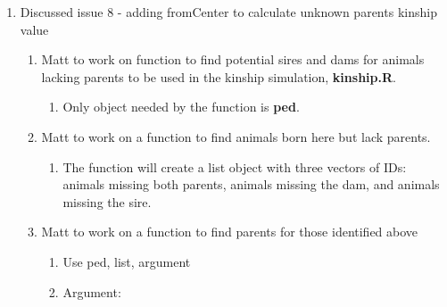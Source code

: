 \documentclass[
]{article}
\providecommand{\tightlist}{%
  \setlength{\itemsep}{0pt}\setlength{\parskip}{0pt}}
\begin{document}
\begin{enumerate}
\def\labelenumi{\arabic{enumi}.}
\tightlist
\item
  Discussed issue 8 - adding fromCenter to calculate unknown parents
  kinship value

  \begin{enumerate}
  \def\labelenumii{\alph{enumii}.}
  \tightlist
  \item
    Matt to work on function to find potential sires and dams for
    animals lacking parents to be used in the kinship simulation,
    \textbf{kinship.R}.

    \begin{enumerate}
    \def\labelenumiii{\arabic{enumiii}.}
    \tightlist
    \item
      Only object needed by the function is \textbf{ped}.
    \end{enumerate}
  \item
    Matt to work on a function to find animals born here but lack
    parents.

    \begin{enumerate}
    \def\labelenumiii{\arabic{enumiii}.}
    \tightlist
    \item
      The function will create a list object with three vectors of IDs:
      animals missing both parents, animals missing the dam, and animals
      missing the sire.
    \end{enumerate}
  \item
    Matt to work on a function to find parents for those identified
    above

    \begin{enumerate}
    \def\labelenumiii{\arabic{enumiii}.}
    \tightlist
    \item
      Use ped, list, argument
    \item
      Argument:


\end{enumerate}
\end{enumerate}
\end{enumerate}
\end{document}
